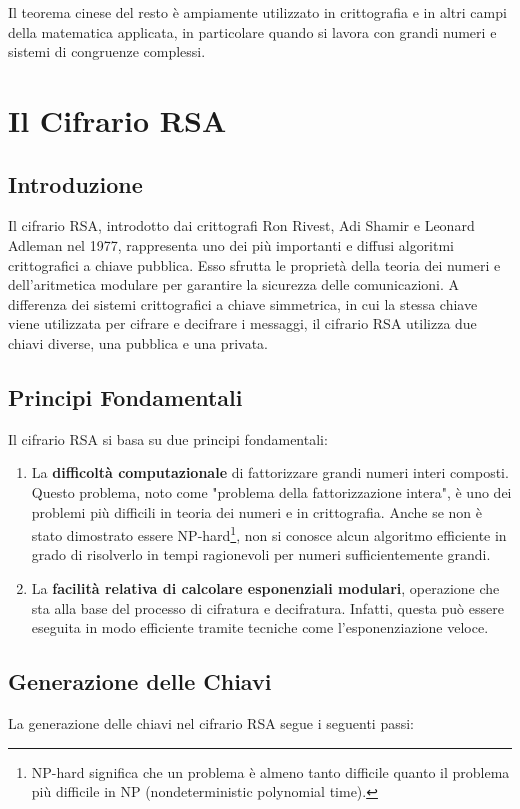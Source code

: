 \documentclass[a4paper,12pt]{report}
\begin{document}
Il teorema cinese del resto è ampiamente utilizzato in crittografia e in altri campi della matematica applicata, in particolare quando si lavora con grandi numeri e sistemi di congruenze complessi.
%
%
%
%
%
%
%
%
%
%
%
%
%
%
%
%
%
%
%
%
%
%
%
%
%
%
%
%
%
%
%
%
%
%
%
%
%
%
%
%
%
\chapter{Il Cifrario RSA}

\section{Introduzione}
Il cifrario RSA, introdotto dai crittografi Ron Rivest, Adi Shamir e Leonard Adleman nel 1977, rappresenta uno dei più importanti e diffusi algoritmi crittografici a chiave pubblica. 
Esso sfrutta le proprietà della teoria dei numeri e dell'aritmetica modulare per garantire la sicurezza delle comunicazioni. 
A differenza dei sistemi crittografici a chiave simmetrica, in cui la stessa chiave viene utilizzata per cifrare e decifrare i messaggi, il cifrario RSA utilizza due chiavi diverse, una pubblica e una privata.

\section{Principi Fondamentali}
Il cifrario RSA si basa su due principi fondamentali:

\begin{enumerate}
    \item La \textbf{difficoltà computazionale} di fattorizzare grandi numeri interi composti. Questo problema, noto come "problema della fattorizzazione intera", è uno dei problemi più difficili in teoria dei numeri e in crittografia. Anche se non è stato dimostrato essere NP-hard\footnote[1]{NP-hard significa che un problema è almeno tanto difficile quanto il problema più difficile in NP (nondeterministic polynomial time).}, non si conosce alcun algoritmo efficiente in grado di risolverlo in tempi ragionevoli per numeri sufficientemente grandi.
    \item La \textbf{facilità relativa di calcolare esponenziali modulari}, operazione che sta alla base del processo di cifratura e decifratura. Infatti, questa può essere eseguita in modo efficiente tramite tecniche come l'esponenziazione veloce.
\end{enumerate}

\section{Generazione delle Chiavi}
La generazione delle chiavi nel cifrario RSA segue i seguenti passi:
\end{document}
